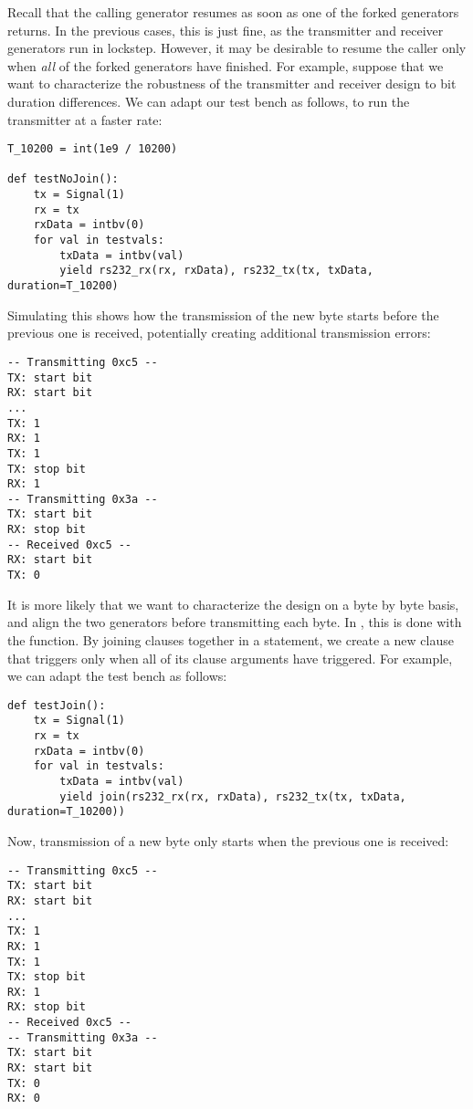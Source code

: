Recall that the calling generator resumes as soon as one of the
forked generators returns. In the previous cases, this is just fine,
as the transmitter and receiver generators run in lockstep. However,
it may be desirable to resume the caller only when \emph{all} of the
forked generators have finished. For example, suppose that we want to
characterize the robustness of the transmitter and receiver design to
bit duration differences. We can adapt our test bench as follows, to
run the transmitter at a faster rate:

\begin{verbatim}
T_10200 = int(1e9 / 10200)

def testNoJoin():
    tx = Signal(1)
    rx = tx
    rxData = intbv(0)
    for val in testvals:
        txData = intbv(val)
        yield rs232_rx(rx, rxData), rs232_tx(tx, txData, duration=T_10200)
\end{verbatim}

Simulating this shows how the transmission of the new byte starts
before the previous one is received, potentially creating additional
transmission errors:

\begin{verbatim}
-- Transmitting 0xc5 --
TX: start bit
RX: start bit
...
TX: 1
RX: 1
TX: 1
TX: stop bit
RX: 1
-- Transmitting 0x3a --
TX: start bit
RX: stop bit
-- Received 0xc5 --
RX: start bit
TX: 0
\end{verbatim}

It is more likely that we want to characterize the design on a byte
by byte basis, and align the two generators before transmitting each
byte. In \myhdl{}, this is done with the  function. By
joining clauses together in a  statement, we create a new
clause that triggers only when all of its clause arguments have
triggered. For example, we can adapt the test bench as follows:

\begin{verbatim}
def testJoin():
    tx = Signal(1)
    rx = tx
    rxData = intbv(0)
    for val in testvals:
        txData = intbv(val)
        yield join(rs232_rx(rx, rxData), rs232_tx(tx, txData, duration=T_10200))
\end{verbatim}

Now, transmission of a new byte only starts when the previous one is received:

\begin{verbatim}
-- Transmitting 0xc5 --
TX: start bit
RX: start bit
...
TX: 1
RX: 1
TX: 1
TX: stop bit
RX: 1
RX: stop bit
-- Received 0xc5 --
-- Transmitting 0x3a --
TX: start bit
RX: start bit
TX: 0
RX: 0
\end{verbatim}

